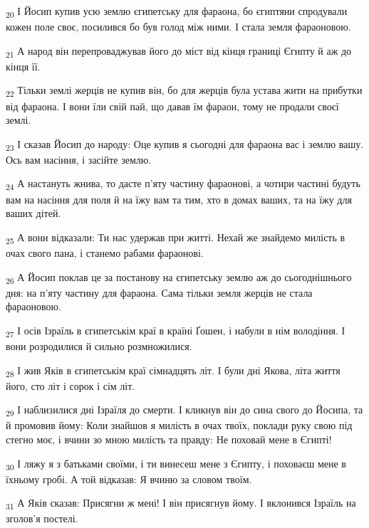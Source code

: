 \begin{tcolorbox}
\textsubscript{20} І Йосип купив усю землю єгипетську для фараона, бо єгиптяни спродували кожен поле своє, посилився бо був голод між ними. І стала земля фараоновою.
\end{tcolorbox}
\begin{tcolorbox}
\textsubscript{21} А народ він перепроваджував його до міст від кінця границі Єгипту й аж до кінця її.
\end{tcolorbox}
\begin{tcolorbox}
\textsubscript{22} Тільки землі жерців не купив він, бо для жерців була устава жити на прибутки від фараона. І вони їли свій пай, що давав їм фараон, тому не продали своєї землі.
\end{tcolorbox}
\begin{tcolorbox}
\textsubscript{23} І сказав Йосип до народу: Оце купив я сьогодні для фараона вас і землю вашу. Ось вам насіння, і засійте землю.
\end{tcolorbox}
\begin{tcolorbox}
\textsubscript{24} А настануть жнива, то дасте п'яту частину фараонові, а чотири частині будуть вам на насіння для поля й на їжу вам та тим, хто в домах ваших, та на їжу для ваших дітей.
\end{tcolorbox}
\begin{tcolorbox}
\textsubscript{25} А вони відказали: Ти нас удержав при житті. Нехай же знайдемо милість в очах свого пана, і станемо рабами фараонові.
\end{tcolorbox}
\begin{tcolorbox}
\textsubscript{26} А Йосип поклав це за постанову на єгипетську землю аж до сьогоднішнього дня: на п'яту частину для фараона. Сама тільки земля жерців не стала фараоновою.
\end{tcolorbox}
\begin{tcolorbox}
\textsubscript{27} І осів Ізраїль в єгипетськім краї в країні Ґошен, і набули в нім володіння. І вони розродилися й сильно розмножилися.
\end{tcolorbox}
\begin{tcolorbox}
\textsubscript{28} І жив Яків в єгипетськім краї сімнадцять літ. І були дні Якова, літа життя його, сто літ і сорок і сім літ.
\end{tcolorbox}
\begin{tcolorbox}
\textsubscript{29} І наблизилися дні Ізраїля до смерти. І кликнув він до сина свого до Йосипа, та й промовив йому: Коли знайшов я милість в очах твоїх, поклади руку свою під стегно моє, і вчини зо мною милість та правду: Не поховай мене в Єгипті!
\end{tcolorbox}
\begin{tcolorbox}
\textsubscript{30} І ляжу я з батьками своїми, і ти винесеш мене з Єгипту, і поховаєш мене в їхньому гробі. А той відказав: Я вчиню за словом твоїм.
\end{tcolorbox}
\begin{tcolorbox}
\textsubscript{31} А Яків сказав: Присягни ж мені! І він присягнув йому. І вклонився Ізраїль на зголов'я постелі.
\end{tcolorbox}
